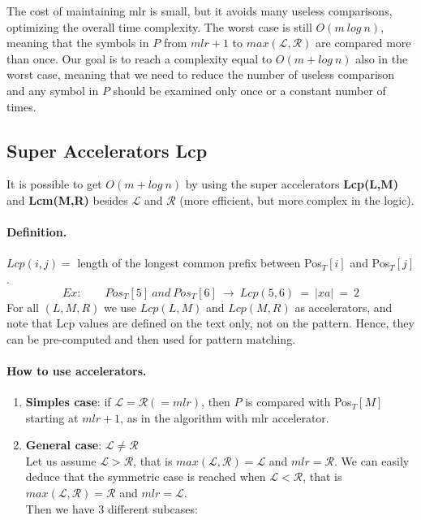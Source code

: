 The cost of maintaining mlr is small, but it avoids many useless comparisons, optimizing the overall time complexity. The worst case is still $O(m~log~n)$, meaning that the symbols in $P$ from $mlr+1$ to $max(\mathcal{L}, \mathcal{R})$ are compared more than once.
Our goal is to reach a complexity equal to $O(m+log~n)$ also in the worst case, meaning that we need to reduce the number of useless comparison and any symbol in $P$ should be examined only once or a constant number of times.

\subsection{Super Accelerators Lcp}
It is possible to get $O(m+log~n)$ by using the super accelerators \textbf{Lcp(L,M)} and \textbf{Lcm(M,R)} besides $\mathcal{L}$ and $\mathcal{R}$ (more efficient, but more complex in the logic).\\


\paragraph{Definition.} $Lcp(i,j) = $ length of the longest common prefix between Pos$_T[i]$ and Pos$_T[j]$.
$$Ex:\qquad Pos_T[5]~and~Pos_T[6] ~\rightarrow~Lcp(5,6)~=~|xa|~=~2$$
For all $(L,M,R)$ we use $Lcp(L,M)$ and $Lcp(M,R)$ as accelerators, and note that Lcp values are defined on the text only, not on the pattern. Hence, they can be pre-computed and then used for pattern matching.

\paragraph{How to use accelerators.}

\begin{enumerate}
	\item \textbf{Simples case}: if $\mathcal{L} = \mathcal{R}(= mlr)$, then $P$ is compared with Pos$_T[M]$ starting at $mlr+1$, as in the algorithm with mlr accelerator.
	
	\item \textbf{General case}: $\mathcal{L} \neq \mathcal{R}$\\
	Let us assume $\mathcal{L} > \mathcal{R}$, that is $max(\mathcal{L},\mathcal{R}) = \mathcal{L}$ and $mlr = \mathcal{R}$. We can easily deduce that the symmetric case is reached when $\mathcal{L} < \mathcal{R}$, that is $max(\mathcal{L},\mathcal{R}) = \mathcal{R}$ and $mlr = \mathcal{L}$.\\
	Then we have $3$ different subcases:
\end{enumerate}


